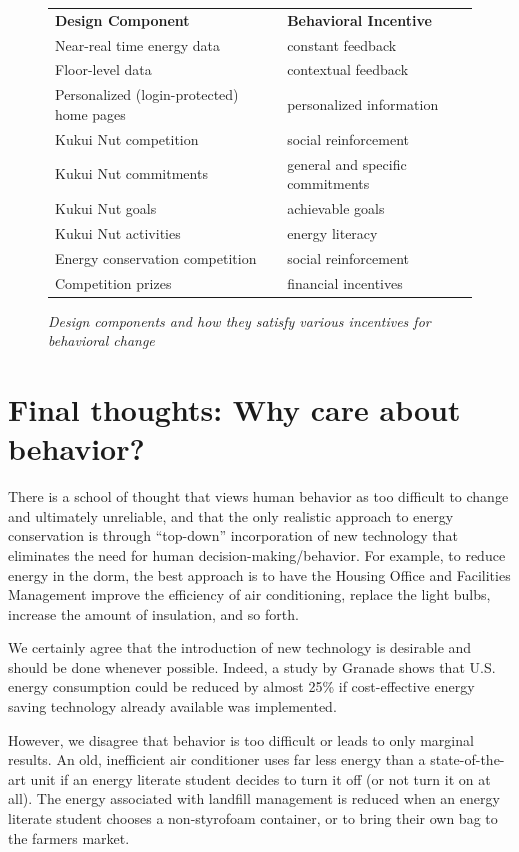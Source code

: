 \documentclass[11pt]{article}
\begin{document}
\begin{figure}[!ht]
\small
\begin{tabular}{p{3in}p{3in}} \hline
{\bf Design Component} & {\bf Behavioral Incentive}  \\
Near-real time energy data & constant feedback \\
Floor-level data & contextual feedback  \\
Personalized (login-protected) home pages  & personalized information \\
Kukui Nut competition & social reinforcement \\ 
Kukui Nut commitments & general and specific commitments \\
Kukui Nut goals & achievable goals \\ 
Kukui Nut activities & energy literacy \\ 
Energy conservation competition & social reinforcement \\
Competition prizes & financial incentives  \\ \hline
\end{tabular}
\normalsize
\caption{{\em Design components and how they satisfy various incentives for behavioral change}}
\label{fig:incentives}
\end{figure}

\section{Final thoughts: Why care about behavior?}

There is a school of thought that views human behavior as too difficult to
change and ultimately unreliable, and that the only realistic approach to
energy conservation is through ``top-down'' incorporation of new technology
that eliminates the need for human decision-making/behavior.  For example,
to reduce energy in the dorm, the best approach is to have the Housing
Office and Facilities Management improve the efficiency of air
conditioning, replace the light bulbs, increase the amount of insulation,
and so forth.

We certainly agree that the introduction of new technology is desirable and
should be done whenever possible.  Indeed, a study by Granade \cite{Granade09}
shows that U.S. energy consumption could be reduced by almost 25\% if
cost-effective energy saving technology already available was implemented.

However, we disagree that behavior is too difficult or leads to only
marginal results.  An old, inefficient air conditioner uses far less energy
than a state-of-the-art unit if an energy literate student decides to turn
it off (or not turn it on at all).  The energy associated with landfill
management is reduced when an energy literate student chooses a
non-styrofoam container, or to bring their own bag to the farmers market.
\end{document}
